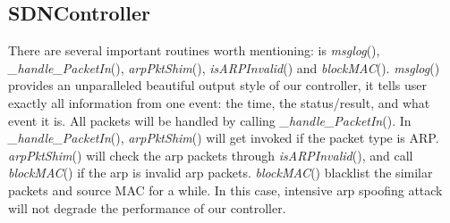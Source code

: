 \documentclass[conference]{IEEEtran}
\begin{document}
\subsection{SDNController}
There are several important routines worth mentioning: is \textit{msglog}(), \textit{\_handle\_PacketIn}(), \textit{arpPktShim}(), \textit{isARPInvalid}() and \textit{blockMAC}(). \textit{msglog}() provides an unparalleled beautiful output style of our controller, it tells user exactly all information from one event: the time, the status/result, and what event it is. All packets will be handled by calling \textit{\_handle\_PacketIn}(). In \textit{\_handle\_PacketIn}(), \textit{arpPktShim}() will get invoked if the packet type is ARP.  \textit{arpPktShim}() will check the arp packets through \textit{isARPInvalid}(), and call \textit{blockMAC}() if the arp is invalid arp packets. \textit{blockMAC}() blacklist the similar packets and source MAC for a while. In this case, intensive arp spoofing attack will not degrade the performance of our controller.
\end{document}
